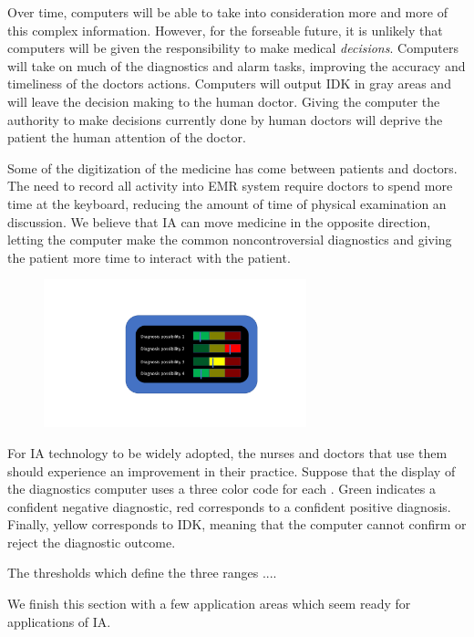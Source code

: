\documentclass[11pt]{article}
\begin{document}
  Over time, computers will be able to take into consideration more
  and more of this complex information. However, for the forseable
  future, it is unlikely that computers will be given the
  responsibility to make medical {\em decisions}. Computers
  will take on much of the diagnostics and alarm tasks, improving the
  accuracy and timeliness of the doctors actions. Computers will
  output IDK in gray areas and will leave the decision making to the
  human doctor. Giving the computer the authority to make decisions
  currently done by human doctors will deprive the patient the human
  attention of the doctor.

  Some of the digitization of the medicine has come between patients
  and doctors. The need to record all activity into EMR system require
  doctors to spend more time at the keyboard, reducing the amount of
  time of physical examination an discussion. We believe that IA can
  move medicine in the opposite direction, letting the computer make
  the common noncontroversial diagnostics and giving the patient more
  time to interact with the patient.

\begin{figure}[h]
\begin{center}
\includegraphics[width=3in]{figures/RedYellowGreen.pdf}
\end{center}
\end{figure}

  For IA technology to be widely adopted, the nurses and doctors that
  use them should experience an improvement in their practice. Suppose
  that the display of the diagnostics computer uses a three color code
  for each . Green indicates a confident
  negative diagnostic, red corresponds to a confident positive
  diagnosis. Finally, yellow corresponds to IDK, meaning that the
  computer cannot confirm or reject the diagnostic outcome.

  The thresholds which define the three ranges .... 


  
  We finish this section with a few application areas which seem ready
  for applications of IA.
  
\end{document}
